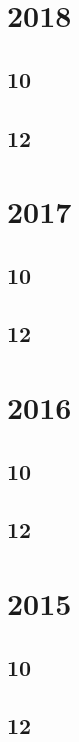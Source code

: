 \section{2018} 
\subsection{10}


\subsection{12}




\section{2017}
\subsection{10}

\subsection{12}




\section{2016}
\subsection{10}

\subsection{12}


\section{2015}
\subsection{10}


\subsection{12}

